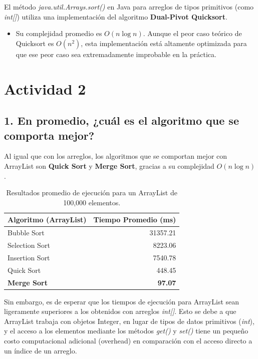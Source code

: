 \documentclass[12pt, letterpaper]{article}
\begin{document}
El método \textit{java.util.Arrays.sort()} en Java para arreglos de tipos primitivos (como \textit{int[]}) utiliza una implementación del algoritmo \textbf{Dual-Pivot Quicksort}.

\begin{itemize}
    \item Su complejidad promedio es \textbf{$O(n \log n)$}. Aunque el peor caso teórico de Quicksort es $O(n^2)$, esta implementación está altamente optimizada para que ese peor caso sea extremadamente improbable en la práctica.
\end{itemize}

\newpage

\section*{Actividad 2}

\subsection*{1. En promedio, ¿cuál es el algoritmo que se comporta mejor?}


Al igual que con los arreglos, los algoritmos que se comportan mejor con ArrayList son \textbf{Quick Sort} y \textbf{Merge Sort}, gracias a su complejidad \textbf{$O(n \log n)$}.

\begin{table}[h!]
\centering
\begin{tabular}{lr}
\toprule
\textbf{Algoritmo (ArrayList)} & \textbf{Tiempo Promedio (ms)} \\
\midrule
Bubble Sort & 31357.21 \\
Selection Sort & 8223.06 \\
Insertion Sort & 7540.78 \\
Quick Sort & 448.45 \\
\textbf{Merge Sort} & \textbf{97.07} \\
\bottomrule
\end{tabular}
\caption{Resultados promedio de ejecución para un ArrayList de 100,000 elementos.}
\label{tab:resultados_arraylist}
\end{table}

Sin embargo, es de esperar que los tiempos de ejecución para ArrayList sean ligeramente superiores a los obtenidos con arreglos \textit{int[]}. Esto se debe a que ArrayList trabaja con objetos Integer, en lugar de tipos de datos primitivos (\textit{int}), y el acceso a los elementos mediante los métodos \textit{get()} y \textit{set()} tiene un pequeño costo computacional adicional (overhead) en comparación con el acceso directo a un índice de un arreglo.
\end{document}
